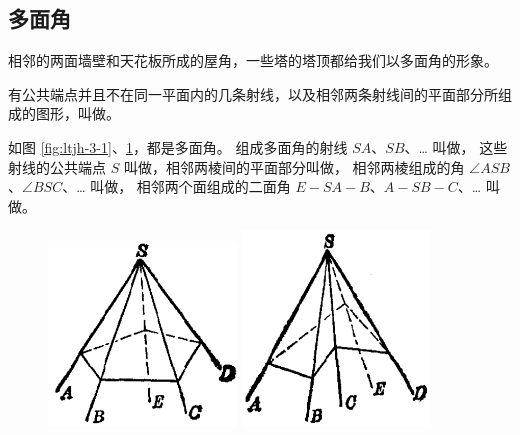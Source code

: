 \subsection{多面角}\label{subsec:3-1}

相邻的两面墙壁和天花板所成的屋角，一些塔的塔顶都给我们以多面角的形象。

有公共端点并且不在同一平面内的几条射线，以及相邻两条射线间的平面部分所组成的图形，叫做。

如图 \ref{fig:ltjh-3-1}、\ref{fig:ltjh-3-2}，都是多面角。 组成多面角的射线 $SA$、$SB$、… 叫做，
这些射线的公共端点 $S$ 叫做，相邻两棱间的平面部分叫做，
相邻两棱组成的角 $\angle ASB$、$\angle BSC$、… 叫做，
相邻两个面组成的二面角 $E{-}SA{-}B$、$A{-}SB{-}C$、… 叫做。

\begin{figure}[htbp]
    \centering
    \begin{minipage}[b]{7cm}
        \centering
        \includegraphics[width=5cm]{../pic/ltjh-ch3-01.png}
        \caption{}\label{fig:ltjh-3-1}
    \end{minipage}
    \qquad \qquad
    \begin{minipage}[b]{7cm}
        \centering
        \includegraphics[width=5cm]{../pic/ltjh-ch3-02.png}
        \caption{}\label{fig:ltjh-3-2}
    \end{minipage}
\end{figure}

